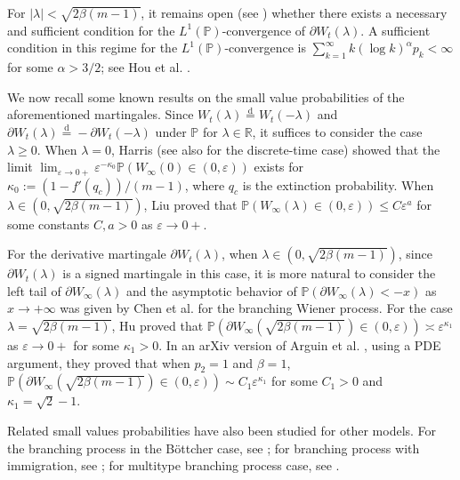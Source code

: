 \documentclass[11pt]{article}
\numberwithin{equation}{section}
\begin{document}
\noindent
For $|\lambda| < \sqrt{2\beta(m-1)}$, it remains open (see \cite[Remark 4]{K04}) whether there exists a necessary and sufficient condition for the $L^1(\mathbb{P})$-convergence of $\partial W_t(\lambda)$. A sufficient condition 
in this regime
for the $L^1(\mathbb{P})$-convergence is $\sum_{k=1}^\infty k (\log k)^{\alpha} p_k < \infty$ for some $\alpha > 3/2$; see Hou et al. \cite[Proposition 2.6]{HRS2024}.

We now 
recall some known results on the small value probabilities of the aforementioned martingales.
Since $W_t(\lambda) \stackrel{\mathrm{d}}{=} W_t(-\lambda)$ and $\partial W_t(\lambda) \stackrel{\mathrm{d}}{=} - \partial W_t(-\lambda)$ under $\mathbb{P}$ for $\lambda \in \mathbb{R}$, 
it suffices to consider the case $\lambda \geq 0$. When $\lambda = 0$, Harris \cite[Remark, p.~110]{Harris1963} (see also \cite{Dubuc, MO2008} for the discrete-time case) showed that
the limit
$\lim_{\varepsilon \to 0+} \varepsilon^{-\kappa_0} \mathbb{P}(W_\infty(0) \in (0, \varepsilon))$ exists for $\kappa_0 := (1 - f'(q_c))/(m - 1)$, where $q_c$ is the extinction probability. 
When $\lambda \in (0, \sqrt{2\beta(m-1)})$, Liu \cite[Theorem 2.4]{Liu2001} proved that $\mathbb{P}(W_\infty(\lambda)
\in (0,\varepsilon)
) \leq C \varepsilon^a$ for some constants $C, a > 0$ as $\varepsilon \to 0+$.

For the derivative martingale $\partial W_t(\lambda)$, 
when $\lambda \in (0,\sqrt{2\beta(m-1)})$, since  $\partial W_t(\lambda)$
is a signed 
martingale  in this case, it is more natural to consider the left tail of $\partial W_\infty(\lambda)$ and  
the asymptotic behavior of $\mathbb{P}
(\partial W_\infty(\lambda)< -x)$ as $x \to +\infty$ was given by Chen et al. \cite[Theorem 1.1]{CHM2025} for the branching Wiener process. For the case $\lambda = \sqrt{2\beta(m-1)}$, Hu \cite[Theorem 1.3]{Hu2016} proved that $\mathbb{P}(\partial W_\infty(\sqrt{2\beta(m-1)}) \in (0, \varepsilon)) \asymp \varepsilon^{\kappa_1}$ as $\varepsilon \to 0+$ for  some $\kappa_1 > 0$. In an arXiv version of Arguin et al. \cite[Proposition A.1]{ABK10}, using a PDE argument, they proved that when $p_2 = 1$
and $\beta=1$, 
$
\mathbb{P}
(\partial W_\infty(\sqrt{2\beta(m-1)}) \in (0, \varepsilon)) \sim C_1 \varepsilon^{\kappa_1}$ for some $C_1 > 0$
and $\kappa_1= \sqrt{2}-1$.


Related small values probabilities have also been studied for other models. For the branching process in the B\"ottcher case, see  \cite{BB1993, FW2009, Hambly}; for branching process with immigration, see \cite{CLR2014, Sidorova}; for multitype branching process case, see \cite{Chu2014, Jones}.
\end{document}

